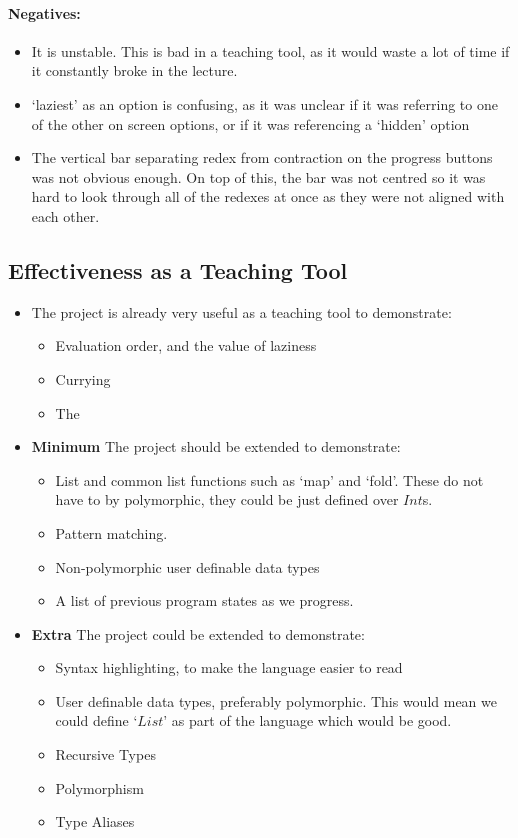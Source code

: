 \paragraph{Negatives:}
\begin{itemize}
    \item It is unstable. This is bad in a teaching tool, as it would waste a lot of time if it constantly broke in the lecture. 
    \item `laziest' as an option is confusing, as it was unclear if it was referring to one of the other on screen options, or if it was referencing a `hidden' option
    \item The vertical bar separating redex from contraction on the progress buttons was not obvious enough. On top of this, the bar was not centred so it was hard to look through all of the redexes at once as they were not aligned with each other. 
\end{itemize}

\subsection{Effectiveness as a Teaching Tool}
\begin{itemize}
    \item The project is already very useful as a teaching tool to demonstrate:
    \begin{itemize}
        \item Evaluation order, and the value of laziness
        \item Currying
        \item The \lcalc
    \end{itemize}
    \item \textbf{Minimum} The project should be extended to demonstrate:
    \begin{itemize}
        \item List and common list functions such as `map' and `fold'. These do not have to by polymorphic, they could be just defined over $Int$s. 
        \item Pattern matching.
        \item Non-polymorphic user definable data types
        \item A list of previous program states as we progress.
    \end{itemize}
    \item \textbf{Extra} The project could be extended to demonstrate:
    \begin{itemize}
        \item Syntax highlighting, to make the language easier to read   
        \item User definable data types, preferably polymorphic. This would mean we could define `$List$' as part of the language which would be good. 
        \item Recursive Types
        \item Polymorphism
        \item Type Aliases
    \end{itemize}
\end{itemize}

